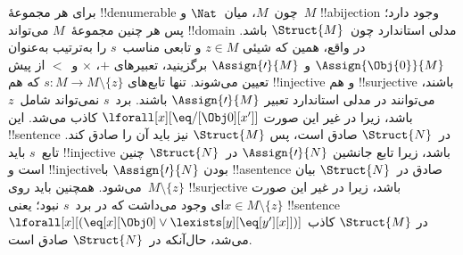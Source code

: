 \documentclass[../../../include/open-logic-section]{subfiles}
\begin{document}
\begin{explain}
برای هر مجموعهٔ !!{denumerable} چون~$M$، میان~$\Nat$ و~$M$
!!a{bijection} وجود دارد؛ پس هر چنین مجموعهٔ~$M$ می‌تواند !!{domain}
مدلی استاندارد چون~$\Struct{M}$ باشد. در واقع، همین که شیئی
$z \in M$ و تابعی مناسب~$s$ را به‌ترتیب به‌عنوان
$\Assign{\Obj{0}}{M}$ و $\Assign{\prime}{M}$ برگزینید، تعبیرهای
$+$، $\times$ و~$<$ از پیش تعیین می‌شوند. تنها تابع‌های
$s\colon M \to M \setminus \{z\}$ که هم !!{injective} و هم
!!{surjective} باشند، می‌توانند در مدلی استاندارد تعبیر
$\Assign{\prime}{M}$ باشند. برد~$s$ نمی‌تواند شامل~$z$ باشد، زیرا در
غیر این صورت $\lforall[x][\eq/[\Obj 0][x']]$ کاذب می‌شد. این
!!{sentence} در~$\Struct{N}$ صادق است، پس $\Struct{M}$ نیز باید آن را
صادق کند. تابع~$s$ باید !!{injective} باشد، زیرا تابع جانشین
$\Assign{\prime}{N}$ در~$\Struct{N}$ چنین است و !!{injective}بودن
$\Assign{\prime}{N}$ با !!a{sentence} صادق در~$\Struct{N}$ بیان
می‌شود. همچنین باید روی~$M \setminus \{z\}$ !!{surjective} باشد، زیرا
در غیر این صورت $x \in M \setminus \{z\}$ای وجود می‌داشت که در
برد~$s$ نبود؛ یعنی !!{sentence}
$\lforall[x][(\eq[x][\Obj 0] \lor \lexists[y][\eq[y'][x]])]$ در
$\Struct{M}$ کاذب می‌شد، حال‌آنکه در~$\Struct{N}$ صادق است.
\end{explain}
\end{document}
